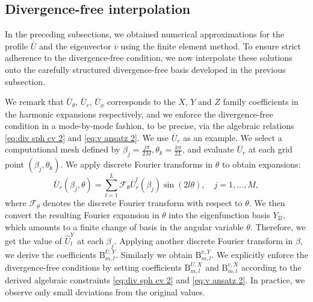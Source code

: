 \documentclass[11pt,a4paper]{article}
\numberwithin{equation}{section}
\newcommand{\Beta}{\mathrm{B}}
\begin{document}
\subsection{Divergence-free interpolation}\label{sec:res cg}

In the preceding subsections, we obtained numerical approximations for the
profile $\overline{U}$ and the eigenvector $\overline{v}$ using the finite element
method. To ensure strict adherence to the divergence-free condition, we now
interpolate these solutions onto the carefully structured divergence-free
basis developed in the previous subsection.

We remark that $\overline{U}_{\theta}$, $\overline{U}_{r}$, $\overline{U}_{\phi}$ corresponds to the $X$, $Y$ and $Z$ family coefficients in the harmonic expansions respectively, and we enforce the divergence-free condition in a mode-by-mode fashion, to be precise, via the algebraic relations \eqref{eq:div sph cv 2} and \eqref{eq:v ansatz 2}.
We use $\overline{U}_{r}$ as an example. We select a computational mesh
defined by $\beta_j = \frac{j \pi}{2 M}, \theta_k = \frac{k \pi}{2 L}$, and
evaluate $\overline{U}_{r}$ at each grid point $(\beta_j, \theta_k)$. We apply
discrete Fourier transforms in $\theta$ to obtain expansions:
\[ \overline{U}_{r} (\beta_j, \theta) = \sum_{l = 1}^L \mathcal{F}_{\theta} 
   \overline{U}_{r}^l (\beta_j) \sin (2 l \theta), \quad j = 1, \ldots, M, \]
where $\mathcal{F}_{\theta}$ denotes the discrete Fourier transform with
respect to $\theta$. We then convert the resulting Fourier expansion in $\theta$ into the eigenfunction basis $Y_{2 l}$, which amounts to a finite change of basis in the angular variable
$\theta$. Therefore, we get the value of $\widehat{U}_l^Y$ at
each $\beta_j$. Applying another discrete Fourier transform in $\beta$, we
derive the coefficients $\Beta^{U, Y}_{m, l}$. Similarly we obtain $\Beta^{v, Y}_{m, l}$.%
We explicitly enforce the divergence-free conditions by setting coefficients
$\Beta^{U, X}_{m, l}$ and $\Beta^{v, X}_{m, l}$ according to the derived
algebraic constraints \eqref{eq:div sph cv 2} and \eqref{eq:v ansatz 2}. In practice, we observe only small deviations from
the original values.
\end{document}
